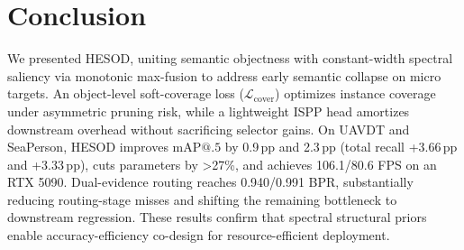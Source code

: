 \section{Conclusion}
\label{sec:conclusion}

We presented HESOD, uniting semantic objectness with constant-width spectral saliency via monotonic max-fusion to address early semantic collapse on micro targets. An object-level soft-coverage loss ($\mathcal{L}_{\mathrm{cover}}$) optimizes instance coverage under asymmetric pruning risk, while a lightweight ISPP head amortizes downstream overhead without sacrificing selector gains. On UAVDT and SeaPerson, HESOD improves $\mathrm{mAP@.5}$ by 0.9\,pp and 2.3\,pp (total recall +3.66\,pp and +3.33\,pp), cuts parameters by \textgreater27\%, and achieves 106.1/80.6 FPS on an RTX 5090. Dual-evidence routing reaches 0.940/0.991 BPR, substantially reducing routing-stage misses and shifting the remaining bottleneck to downstream regression. These results confirm that spectral structural priors enable accuracy-efficiency co-design for resource-efficient deployment.
